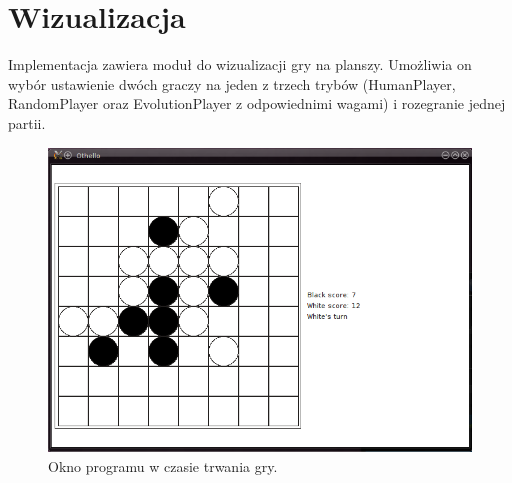 \section{Wizualizacja}
 Implementacja zawiera moduł do wizualizacji gry na planszy. Umożliwia on wybór ustawienie dwóch graczy na jeden z trzech trybów (HumanPlayer, RandomPlayer oraz EvolutionPlayer z odpowiednimi wagami) i rozegranie jednej partii.
 
 \begin{figure}[h!]
\centering
\includegraphics[scale=0.5]{img/vis_window.png}
\caption{Okno programu w czasie trwania gry.} 
\end{figure}

 
 